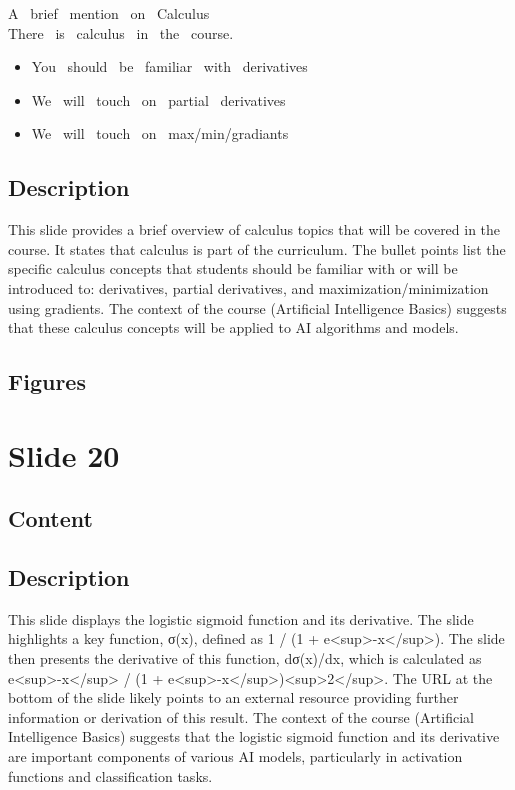 \documentclass{article}%
\begin{document}
A \ brief \ mention \ on \ Calculus \\
There \ is \ calculus \ in \ the \ course. \\
\begin{itemize}
\item You \ should \ be \ familiar \ with \ derivatives
\item We \ will \ touch \ on \ partial \ derivatives
\item We \ will \ touch \ on \ max/min/gradiants
\end{itemize}
%
\subsection{Description}%
This slide provides a brief overview of calculus topics that will be covered in the course.  It states that calculus is part of the curriculum.  The bullet points list the specific calculus concepts that students should be familiar with or will be introduced to: derivatives, partial derivatives, and maximization/minimization using gradients.  The context of the course (Artificial Intelligence Basics) suggests that these calculus concepts will be applied to AI algorithms and models.%
\subsection{Figures}%
\begin{figure}[H]%
\centering%
\end{figure}

%
\newpage%
\section{Slide 20}%
\label{sec:Slide20}%
\subsection{Content}%
%
\subsection{Description}%
This slide displays the logistic sigmoid function and its derivative.  The slide highlights a key function, σ(x), defined as 1 / (1 + e<sup>-x</sup>).  The slide then presents the derivative of this function, dσ(x)/dx, which is calculated as e<sup>-x</sup> / (1 + e<sup>-x</sup>)<sup>2</sup>.  The URL at the bottom of the slide likely points to an external resource providing further information or derivation of this result.  The context of the course (Artificial Intelligence Basics) suggests that the logistic sigmoid function and its derivative are important components of various AI models, particularly in activation functions and classification tasks.%
\end{document}
